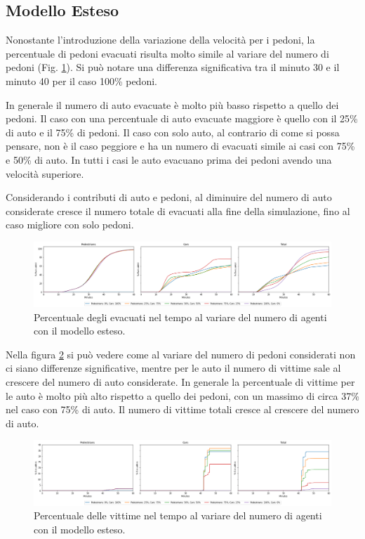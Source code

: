\pagebreak

\subsection{Modello Esteso}
Nonostante l'introduzione della variazione della velocità per i pedoni, 
la percentuale di pedoni evacuati risulta molto simile al variare del numero di pedoni (Fig. \ref{fig:analisi-new-evacuated}). 
Si può notare una differenza significativa tra il minuto 30 e il minuto 40 per il caso 100\% pedoni.

In generale il numero di auto evacuate è molto più basso rispetto a quello dei pedoni. 
Il caso con una percentuale di auto evacuate maggiore è quello con il 25\% di auto e il 75\% di pedoni.
Il caso con solo auto, al contrario di come si possa pensare, non è il caso peggiore e ha un numero di evacuati simile ai casi 
con 75\% e 50\% di auto.
%
In tutti i casi le auto evacuano prima dei pedoni avendo una velocità superiore.

Considerando i contributi di auto e pedoni, al diminuire del numero di auto considerate cresce il numero totale di evacuati alla fine della simulazione,
fino al caso migliore con solo pedoni.

\begin{figure}[ht]
    \centering
    \includegraphics[width=\textwidth]{images/analisi/new-evacuated.png}
    \caption{Percentuale degli evacuati nel tempo al variare del numero di agenti con il modello esteso.}
    \label{fig:analisi-new-evacuated}
\end{figure}

Nella figura \ref{fig:analisi-new-casualties} si può vedere come al variare del numero di pedoni considerati 
non ci siano differenze significative, mentre per le auto il numero di vittime sale al crescere del numero di auto considerate.
In generale la percentuale di vittime per le auto è molto più alto rispetto a quello dei pedoni, con un massimo di circa 37\% nel caso con 75\% di auto. 
%
Il numero di vittime totali cresce al crescere del numero di auto.

\begin{figure}[ht]
    \centering
    \includegraphics[width=\textwidth]{images/analisi/new-casualties.png}
    \caption{Percentuale delle vittime nel tempo al variare del numero di agenti con il modello esteso.}
    \label{fig:analisi-new-casualties}
\end{figure}

